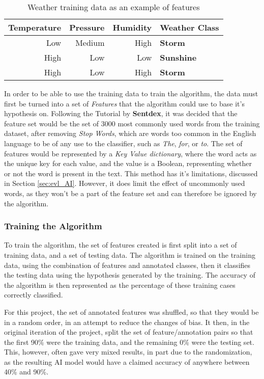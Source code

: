 \begin{table}[ht!]
\centering
\begin{tabular}{r | r | r || l}
\textbf{Temperature} & \textbf{Pressure} & \textbf{Humidity} & \textbf{Weather Class} \\
\hline
Low  & Medium  & High & \textbf{Storm}    \\
High & Low     & Low  & \textbf{Sunshine} \\
High & Low     & High & \textbf{Storm}

\end{tabular}
\caption{Weather training data as an example of features}
\label{tbl:weather_feature}
\end{table}

In order to be able to use the training data to train the algorithm, the data must first be turned into a set of \emph{Features} that the algorithm could use to base it's hypothesis on. Following the Tutorial by \textbf{Sentdex}\cite{NLTKYoutubePlaylist}, it was decided that the feature set would be the set of 3000 most commonly used words from the training dataset, after removing \emph{Stop Words}, which are words too common in the English language to be of any use to the classifier, such as \emph{The}, \emph{for}, or \emph{to}. The set of features would be represented by a \emph{Key Value dictionary}, where the word acts as the unique key for each value, and the value is a Boolean, representing whether or not the word is present in the text. This method has it's limitations, discussed in Section \ref{sec:evl_AI}. However, it does limit the effect of uncommonly used words, as they won't be a part of the feature set and can therefore be ignored by the algorithm.

\subsubsection{Training the Algorithm}
\label{sec:imp_train_algorithm}
To train the algorithm, the set of features created is first split into a set of training data, and a set of testing data. The algorithm is trained on the training data, using the combination of features and annotated classes, then it classifies the testing data using the hypothesis generated by the training. The accuracy of the algorithm is then represented as the percentage of these training cases correctly classified.

For this project, the set of annotated features was shuffled, so that they would be in a random order, in an attempt to reduce the changes of bias. It then, in the original iteration of the project, split the set of feature/annotation pairs so that the first 90\% were the training data, and the remaining 0\% were the testing set. This, however, often gave very mixed results, in part due to the randomization, as the resulting AI model would have a claimed accuracy of anywhere between 40\% and 90\%.

